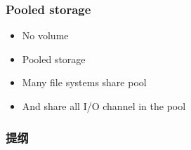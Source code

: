 % 
% 
\begin{frame}[fragile]
    \frametitle{Pooled storage}
    \begin{itemize}
        \item No volume
        \item Pooled storage
        \item Many file systems share pool
        \item And share all I/O channel in the pool
    \end{itemize}
\end{frame}
% 
% 
\begin{frame}
\frametitle{提纲} %
\tableofcontents %
\end{frame}
